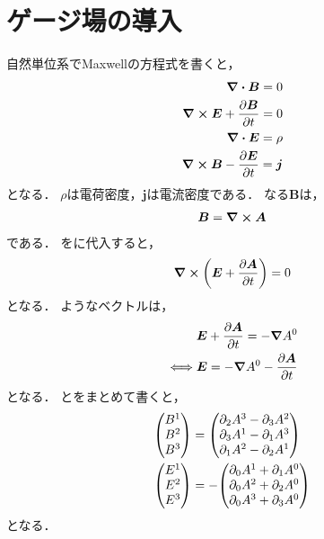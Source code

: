 \documentclass{report}
\begin{document}
  \section{ゲージ場の導入}
    自然単位系でMaxwellの方程式を書くと，
    \begin{align}
      \div\bm{B} = 0 \label{maxwell-1} \\ 
      \curl\bm{E} + \pdv{\bm{B}}{t} = 0 \label{maxwell-2} \\ 
      \div\bm{E} = \rho \label{maxwell-3} \\ 
      \curl\bm{B} - \pdv{\bm{E}}{t} = \bm{j}\label{maxwell-4} 
    \end{align}
    となる．
    $\rho$は電荷密度，$\bm{j}$は電流密度である．
    なる$\bm{B}$は，
    \begin{align}
      \bm{B} = \curl{\bm{A}}\label{b-gauge}
    \end{align}
    である．
    をに代入すると，
    \begin{align}
      \curl\qty(\bm{E} + \pdv{\bm{A}}{t}) = 0\label{e-gauge-1}
    \end{align}
    となる．
    ようなベクトルは，
    \begin{align}
      &\bm{E} + \pdv{\bm{A}}{t} = -\grad A^0 \\ 
      \iff& \bm{E} = -\grad A^0 -\pdv{\bm{A}}{t} \label{e-gauge}
    \end{align}
    となる．
    とをまとめて書くと，
    \begin{align}
      \mqty(B^1 \\ B^2 \\ B^3) &= \mqty(\partial_2A^3 - \partial_3A^2 \\ \partial_3A^1 - \partial_1A^3 \\ \partial_1A^2 - \partial_2A^1) \\ 
      \mqty(E^1 \\ E^2 \\ E^3) &= -\mqty(\partial_0A^1 + \partial_1A^0  \\ \partial_0A^2 + \partial_2A^0  \\ \partial_0A^3 + \partial_3A^0 )
    \end{align}
    となる．
\end{document}
